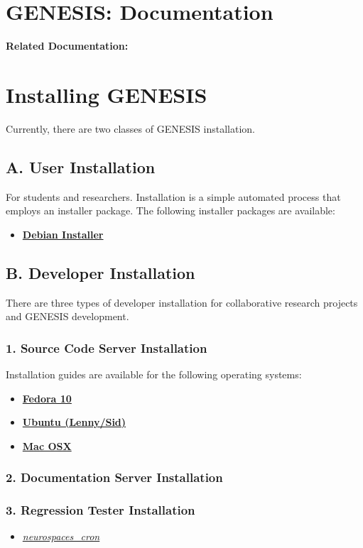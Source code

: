 \documentclass[12pt]{article}
\begin{document}
\section*{GENESIS: Documentation}

{\bf Related Documentation:}

\section*{Installing GENESIS}

Currently, there are two classes of GENESIS installation.

\subsection*{A. User Installation}

For students and researchers. Installation is a simple automated process that employs an installer package. The following installer packages are available:
\begin{itemize}
   \item[] \href{../installation-debian/installation-debian.tex}{\bf Debian Installer}
\end{itemize}
   
\subsection*{B. Developer Installation}

There are three types of developer installation for collaborative research projects and GENESIS development.

\subsubsection*{1. Source Code Server Installation}

Installation guides are available for the following operating systems:
\begin{itemize}
   \item \href{../installation-fedora10/installation-fedora10.tex}{\bf Fedora 10}
   \item \href{../installation-ubuntu-lennysid/installation-ubuntu-lennysid.tex}{\bf Ubuntu (Lenny/Sid)}
   \item \href{../installation-osx/installation-osx.tex}{\bf Mac OSX}
\end{itemize}   

\subsubsection*{2. Documentation Server Installation}

\subsubsection*{3. Regression Tester Installation}

\begin{itemize}
   \item[]\href{../neurospaces\_cron/neurospaces\_cron.tex}{\it neurospaces\_cron}
\end{itemize}
\end{document}
